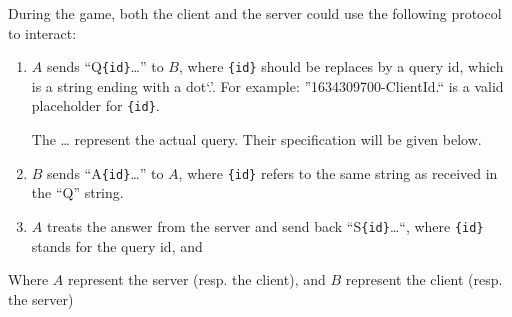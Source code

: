 \documentclass{article}
\begin{document}
During the game, both the client and the server could use the following
protocol to interact:
\begin{enumerate}
	\item \(A\) sends ``Q\texttt{\{id\}}\dots'' to \(B\), where \texttt{\{id\}}
	should be replaces by a query id, which is a string ending with a dot`.'.
	For example: ''1634309700-ClientId.`` is a valid placeholder for
	\texttt{\{id\}}.

	The \dots{} represent the actual query. Their specification will be given
	below.

	\item \(B\) sends ``A\texttt{\{id\}}\dots'' to \(A\), where \texttt{\{id\}}
	refers to the same string as received in the ``Q'' string.

	\item \(A\) treats the answer from the server and send back
	``S\texttt{\{id\}}\dots``, where \texttt{\{id\}} stands for the query id,
	and
\end{enumerate}
Where \(A\) represent the server (resp. the client), and \(B\) represent the
client (resp. the server)
\end{document}
